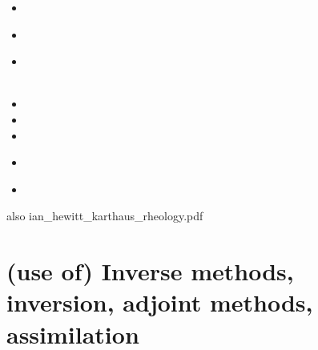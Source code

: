 \begin{small}
\begin{itemize}
\item[\twothousandseventeen] 
 \\
\item[\twothousandeighteen] 
 \\
\item[\twothousandnineteen] 
 \\
 \\
\item[\twothousandtwenty] 
\item[\twothousandtwentyone] 
\item[\twothousandtwentytwo]
\item[\twothousandtwentythree]
 \\
\item[\twothousandtwentyfour]
 \\
\end{itemize}
\end{small}


also ian\_hewitt\_karthaus\_rheology.pdf


\section{(use of) Inverse methods, inversion, adjoint methods, assimilation}

